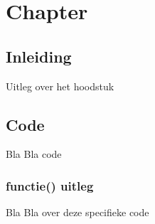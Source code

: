 \chapter{Chapter}
\section{Inleiding}
Uitleg over het hoodstuk
\newpage

\section{Code}
Bla Bla code

\subsection{functie() uitleg}
Bla Bla over deze specifieke code